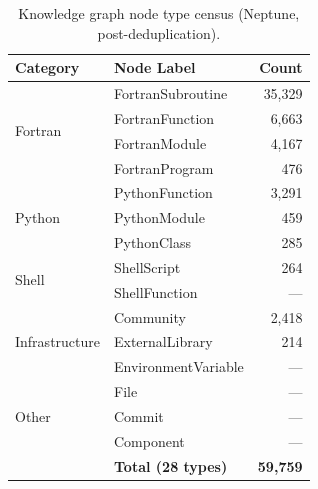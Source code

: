 \documentclass[11pt,letterpaper]{article}
\begin{document}
\begin{table}[H]
\centering
\footnotesize
\begin{tabular}{@{}llr@{}}
\toprule
\textbf{Category} & \textbf{Node Label} & \textbf{Count} \\
\midrule
\multirow{4}{*}{Fortran} & FortranSubroutine & 35,329 \\
& FortranFunction & 6,663 \\
& FortranModule & 4,167 \\
& FortranProgram & 476 \\
\midrule
\multirow{3}{*}{Python} & PythonFunction & 3,291 \\
& PythonModule & 459 \\
& PythonClass & 285 \\
\midrule
\multirow{2}{*}{Shell} & ShellScript & 264 \\
& ShellFunction & --- \\
\midrule
\multirow{3}{*}{Infrastructure} & Community & 2,418 \\
& ExternalLibrary & 214 \\
& EnvironmentVariable & --- \\
\midrule
\multirow{3}{*}{Other} & File & --- \\
& Commit & --- \\
& Component & --- \\
\midrule
& \textbf{Total (28 types)} & \textbf{59,759} \\
\bottomrule
\end{tabular}
\caption{Knowledge graph node type census (Neptune, post-deduplication).}
\label{tab:graph-census}
\end{table}
\end{document}
